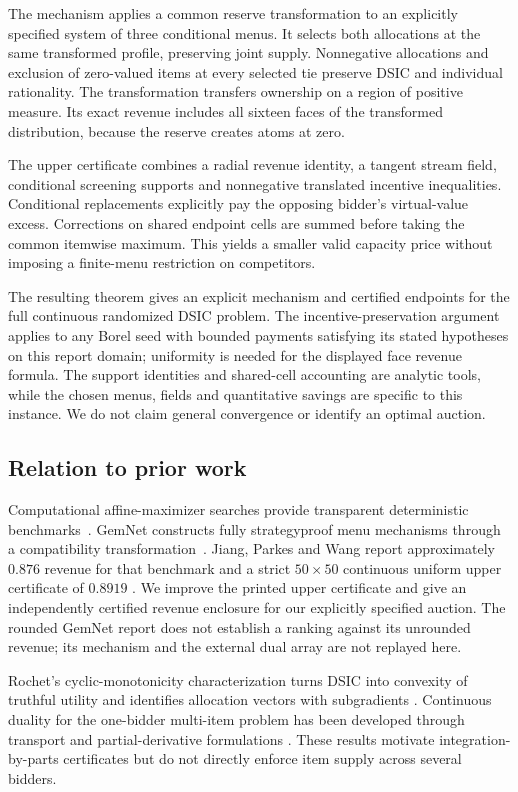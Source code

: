 \documentclass[11pt]{article}
\begin{document}
The mechanism applies a common reserve transformation to an explicitly
specified system of three conditional menus. It selects both allocations
at the same transformed profile, preserving joint supply. Nonnegative
allocations and exclusion of zero-valued items at every selected tie preserve
DSIC and individual rationality. The transformation transfers ownership on
a region of positive measure. Its exact revenue includes all sixteen faces
of the transformed distribution, because the reserve creates atoms at zero.

The upper certificate combines a radial revenue identity, a tangent stream
field, conditional screening supports and nonnegative translated incentive
inequalities. Conditional replacements explicitly pay the opposing bidder's
virtual-value excess. Corrections on shared endpoint cells are summed before
taking the common itemwise maximum. This yields a smaller valid capacity
price without imposing a finite-menu restriction on competitors.

The resulting theorem gives an explicit mechanism and certified endpoints
for the full continuous randomized DSIC problem. The incentive-preservation
argument applies to any Borel seed with bounded payments satisfying its stated hypotheses on this report
domain; uniformity is needed for the displayed face revenue formula.
The support identities and shared-cell accounting are analytic tools, while
the chosen menus, fields and quantitative savings are specific to this
instance. We do not claim general convergence or identify an optimal auction.

\subsection{Relation to prior work}
Computational affine-maximizer searches provide transparent deterministic
benchmarks~\citep{sandholm2015}. GemNet constructs fully strategyproof menu
mechanisms through a compatibility transformation~\citep{wang2024gemnet}.
Jiang, Parkes and Wang report approximately $0.876$ revenue for that benchmark
and a strict $50\times50$ continuous uniform upper certificate of $0.8919$
\citep{jiang2026duality}. We improve the printed upper certificate and give an
independently certified revenue enclosure for our explicitly specified auction.
The rounded GemNet report does not establish a ranking against its unrounded
revenue; its mechanism and the external dual array are not replayed here.

Rochet's cyclic-monotonicity characterization turns DSIC into convexity of
truthful utility and identifies allocation vectors with subgradients
\citep{rochet1987}.  Continuous duality for the one-bidder multi-item problem
has been developed through transport and partial-derivative formulations
\citep{daskalakis2017strong,giannakopoulos2018duality}.  These results motivate
integration-by-parts certificates but do not directly enforce item supply
across several bidders.
\end{document}
